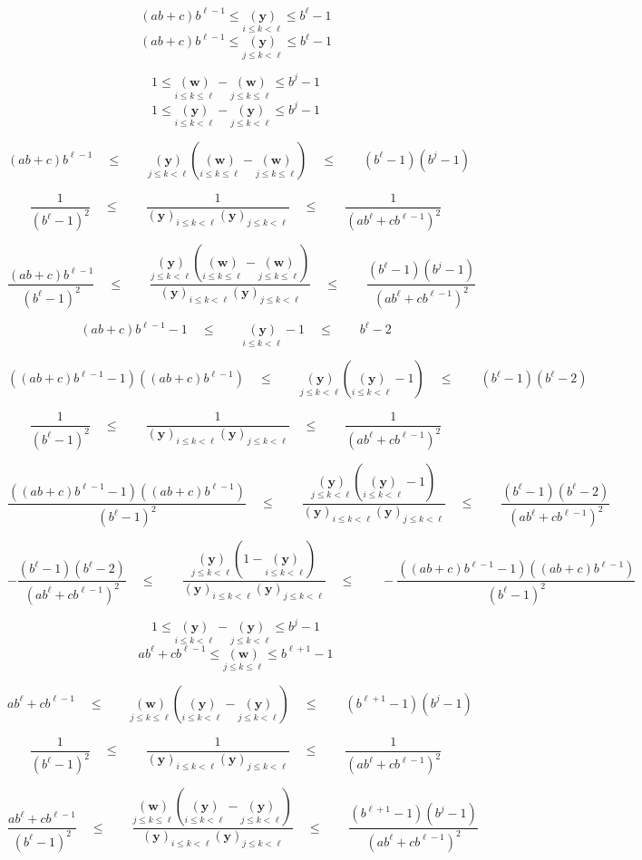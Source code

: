 \documentclass[twoside]{article}
\renewcommand{\leq}{\ensuremath{\quad\le\qquad}}
\newcommand{\bradix}[2][u]{\ensuremath{\underset{#2}{(\bm{#1})}}}
\newcommand{\denom}[3][y]{\ensuremath{(\bm{#1})_{#2\le k <  #3}}}
\begin{document}
$$ (ab+c)b^{\ell-1}\le\bradix[y]{i\le k < \ell}\le b^\ell-1 $$
$$ (ab+c)b^{\ell-1}\le\bradix[y]{j\le k < \ell}\le b^\ell-1 $$

$$ 1\le\bradix[w]{i\le k\le\ell}-\bradix[w]{j\le k\le\ell}\le b^j-1 $$
$$ 1\le\bradix[y]{i\le k < \ell}-\bradix[y]{j\le k < \ell}\le b^j-1 $$

$$ (ab+c)b^{\ell-1}
	\leq\bradix[y]{j\le k < \ell}\left(\bradix[w]{i\le k\le\ell}-\bradix[w]{j\le k\le\ell}\right)
	\leq (b^\ell-1)(b^j-1) $$

$$ \frac{1}{(b^\ell-1)^2}
	\leq\frac{1}{\denom{i}{\ell}\denom{j}{\ell}}
	\leq\frac{1}{(ab^\ell+cb^{\ell-1})^2} $$

$$ \frac{(ab+c)b^{\ell-1}}{(b^\ell-1)^2}
	\leq\frac{\bradix[y]{j\le k < \ell}\left(\bradix[w]{i\le k\le\ell}-\bradix[w]{j\le k\le\ell}\right)}{\denom{i}{\ell}\denom{j}{\ell}}
	\leq\frac{(b^\ell-1)(b^j-1)}{(ab^\ell+cb^{\ell-1})^2} $$

$$ (ab+c)b^{\ell-1}-1
	\leq\bradix[y]{i\le k < \ell}-1
	\leq b^\ell-2 $$

$$ \left((ab+c)b^{\ell-1}-1\right)\left((ab+c)b^{\ell-1}\right)
	\leq\bradix[y]{j\le k < \ell}\left(\bradix[y]{i\le k < \ell}-1\right)
	\leq (b^\ell-1)(b^\ell-2) $$

$$ \frac{1}{(b^\ell-1)^2}
	\leq\frac{1}{\denom{i}{\ell}\denom{j}{\ell}}
	\leq\frac{1}{(ab^\ell+cb^{\ell-1})^2} $$

$$ \frac{\left((ab+c)b^{\ell-1}-1\right)\left((ab+c)b^{\ell-1}\right)}{(b^\ell-1)^2}
	\leq\frac{\bradix[y]{j\le k < \ell}\left(\bradix[y]{i\le k < \ell}-1\right)}{\denom{i}{\ell}\denom{j}{\ell}}
	\leq\frac{(b^\ell-1)(b^\ell-2)}{(ab^\ell+cb^{\ell-1})^2} $$

$$ -\frac{(b^\ell-1)(b^\ell-2)}{(ab^\ell+cb^{\ell-1})^2}
	\leq\frac{\bradix[y]{j\le k < \ell}\left(1-\bradix[y]{i\le k < \ell}\right)}{\denom{i}{\ell}\denom{j}{\ell}}
	\leq-\frac{\left((ab+c)b^{\ell-1}-1\right)\left((ab+c)b^{\ell-1}\right)}{(b^\ell-1)^2} $$

$$ 1\le\bradix[y]{i\le k < \ell}-\bradix[y]{j\le k < \ell}\le b^j-1 $$
$$ ab^\ell+cb^{\ell-1}\le\bradix[w]{j\le k\le\ell}\le b^{\ell+1}-1 $$

$$ ab^\ell+cb^{\ell-1}
	\leq\bradix[w]{j\le k\le\ell}\left(\bradix[y]{i\le k < \ell}-\bradix[y]{j\le k < \ell}\right)
	\leq (b^{\ell+1}-1)(b^j-1) $$

$$ \frac{1}{(b^\ell-1)^2}
	\leq\frac{1}{\denom{i}{\ell}\denom{j}{\ell}}
	\leq\frac{1}{(ab^\ell+cb^{\ell-1})^2} $$

$$ \frac{ab^\ell+cb^{\ell-1}}{(b^\ell-1)^2}
	\leq\frac{\bradix[w]{j\le k\le\ell}\left(\bradix[y]{i\le k < \ell}-\bradix[y]{j\le k < \ell}\right)}{\denom{i}{\ell}\denom{j}{\ell}}
	\leq\frac{(b^{\ell+1}-1)(b^j-1)}{(ab^\ell+cb^{\ell-1})^2} $$
\end{document}
